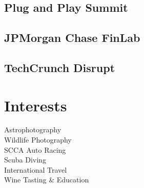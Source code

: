 \documentclass[]{jhearn-resume}
\begin{document}
\begin{minipage}[t]{0.30\textwidth}
\subsection{Plug and Play Summit}
\sectionsep

\subsection{JPMorgan Chase FinLab}
\sectionsep

\subsection{TechCrunch Disrupt}
\sectionsep


\section{Interests}
Astrophotography \\
Wildlife Photography \\
SCCA Auto Racing \\
Scuba Diving \\
International Travel \\
Wine Tasting \& Education\\


\end{minipage} 
\end{document}
